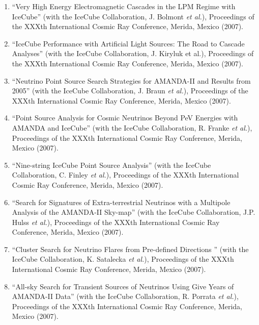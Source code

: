 \begin{enumerate}
\item ``Very High Energy Electromagnetic Cascades in the LPM
        Regime with   IceCube'' (with the IceCube
        Collaboration, J. Bolmont {\it et al.}),
        Proceedings of the XXXth International Cosmic Ray
        Conference,   Merida, Mexico (2007).

\item ``IceCube Performance with Artificial Light Sources:
        The Road to   Cascade Analyses'' (with the IceCube
        Collaboration, J. Kiryluk et   al.), Proceedings of
        the XXXth International Cosmic Ray Conference,
        Merida, Mexico (2007).

\item ``Neutrino Point Source Search Strategies for
        AMANDA-II and   Results from 2005'' (with the
        IceCube Collaboration, J. Braun {\it et al.}),
        Proceedings of the XXXth International Cosmic Ray
        Conference,   Merida, Mexico (2007).

\item ``Point Source Analysis for Cosmic Neutrinos Beyond
        PeV Energies   with AMANDA and IceCube'' (with the
        IceCube Collaboration, R. Franke   {\it et al.}),
        Proceedings of the XXXth International Cosmic Ray
        Conference, Merida, Mexico (2007).

\item ``Nine-string IceCube Point Source Analysis'' (with
        the IceCube   Collaboration, C. Finley {\it et
        al.}), Proceedings of the XXXth   International
        Cosmic Ray Conference, Merida, Mexico (2007).

\item ``Search for Signatures of Extra-terrestrial Neutrinos
        with a   Multipole Analysis of the AMANDA-II
        Sky-map'' (with the IceCube   Collaboration, J.P.
        Hulss {\it et al.}), Proceedings of the XXXth
        International Cosmic Ray Conference, Merida, Mexico
        (2007).

\item ``Cluster Search for Neutrino Flares from Pre-defined
        Directions  '' (with the IceCube Collaboration, K.
        Satalecka {\it et al.}), Proceedings   of the XXXth
        International Cosmic Ray Conference, Merida, Mexico
        (2007).

\item ``All-sky Search for Transient Sources of Neutrinos
        Using Give   Years of AMANDA-II Data'' (with the
        IceCube Collaboration, R. Porrata   {\it et al.}),
        Proceedings of the XXXth International Cosmic Ray
        Conference, Merida, Mexico (2007).


\end{enumerate}

